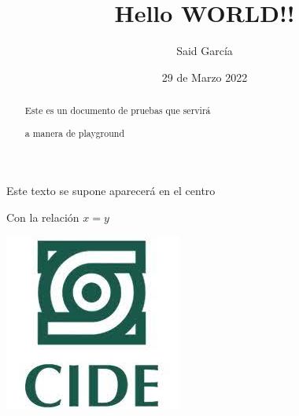 \documentclass{article}
\title{Hello WORLD!!}
\author{Said García}
\date{29 de Marzo 2022}
\begin{document}
  \begin{titlepage}
    \maketitle
    \begin{abstract}
      Este es un documento de pruebas que servirá \par
      a manera de playground
    \end{abstract}
    \begin{center}
      Este texto se supone aparecerá en el centro
      
      Con la relación $x=y$  \par
      \includegraphics{cide.jpg}
    \end{center}

  \end{titlepage}
\end{document}
